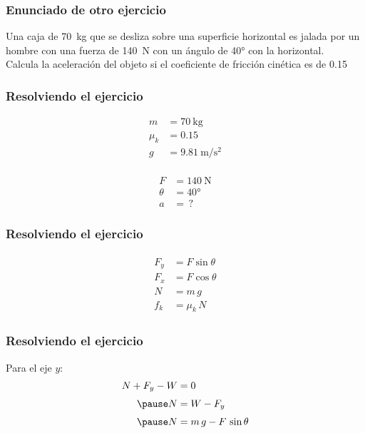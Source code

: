 \documentclass[14pt]{beamer}
\begin{document}
\begin{frame}
\frametitle{Enunciado de otro ejercicio}
Una caja de \SI{70}{\kilo\gram} que se desliza sobre una superficie horizontal es jalada por un hombre con una fuerza de \SI{140}{\newton} con un ángulo de \ang{40} con la horizontal.
\\
\bigskip
\pause
Calcula la aceleración del objeto si el coeficiente de fricción cinética es de \num{0.15}
\end{frame}
\begin{frame}
\frametitle{Resolviendo el ejercicio}
\pause
\begin{minipage}[t]{0.4\linewidth}
\begin{align*}
m &= \SI{70}{\kilo\gram} \\[0.2em]
\mu_{k} &= \num{0.15} \\[0.2em]
g &= \SI{9.81}{\meter\per\square\second} \\[0.2em]
\end{align*}
\end{minipage}
\begin{minipage}[t]{0.4\linewidth}
\begin{align*}
F &= \SI{140}{\newton} \\[0.2em]
\theta &= \ang{40}\\[0.2em]
a &= \, ?
\end{align*}
\end{minipage}
\end{frame}
\begin{frame}
\frametitle{Resolviendo el ejercicio}
\pause
\begin{eqnarray*}
\begin{aligned}
F_{y} &= F \sin \theta \\[0.3em]
F_{x} &= F \cos \theta \\[0.3em]
N &= m \, g \\[0.3em]
f_{k} &= \mu_{k} \, N
\end{aligned}
\end{eqnarray*}
\end{frame}
\begin{frame}
\frametitle{Resolviendo el ejercicio}
Para el eje $y$:
\pause
\begin{eqnarray*}
\begin{aligned}
N + F_{y} - W &= 0 \\[0.3em] \pause
N &= W - F_{y} \\[0.3em] \pause
N &= m \, g - F \, \sin \theta
\end{aligned}
\end{eqnarray*}
\end{frame}
\end{document}
